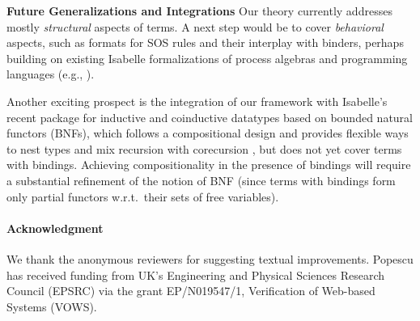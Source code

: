 \documentclass{llncs}
\begin{document}
{\bf Future Generalizations and Integrations}  
%
Our theory currently addresses mostly {\em structural} aspects of terms. A next step would be 
to cover {\em behavioral} aspects, such as formats for SOS rules and their interplay with binders, 
perhaps building on existing Isabelle formalizations of process algebras and programming languages 
(e.g., \cite{pop-coind,prob-nonint,conc-nonint,DBLP:conf/popl/NipkowO98,lochbihler-2012,psiInIsa}). 
  
Another exciting prospect is the integration of our framework with Isabelle's recent  
package for inductive and coinductive datatypes \cite{blanchette-et-al-2014-tru} 
based on bounded natural functors (BNFs),  
which follows a compositional design \cite{traytel-et-al-2012}
and provides flexible ways to nest types \cite{nonuniform-lics2017} and mix recursion with 
corecursion \cite{fouco,amico}, but does not yet cover terms with bindings. 
Achieving compositionality in the presence of bindings will require a substantial 
refinement of the notion of BNF (since terms with bindings form only partial functors w.r.t.\ their sets of free variables). 






  



\smallskip
\paragraph*{\small Acknowledgment}  

\small
We thank the
anonymous reviewers for suggesting textual improvements.
%
%
Popescu has received funding from UK's Engineering and Physical Sciences Research Council 
(EPSRC) via the grant EP/N019547/1, Verification of Web-based  Systems (VOWS).     



{}



\end{document}
